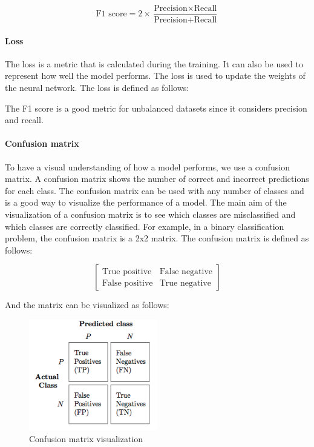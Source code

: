 \begin{equation}
    \text{F1 score} = 2 \times \frac{\text{Precision} \times \text{Recall}}{\text{Precision} + \text{Recall}}
\end{equation}

\paragraph{Loss}

The loss is a metric that is calculated during the training. It can also be used to represent how well the model performs. The loss is used to update the weights of the neural network. The loss is defined as follows:

The F1 score is a good metric for unbalanced datasets since it considers precision and recall. 

\paragraph{Confusion matrix}

To have a visual understanding of how a model performs, we use a confusion matrix. A confusion matrix shows the number of correct and incorrect predictions for each class. The confusion matrix can be used with any number of classes and is a good way to visualize the performance of a model. The main aim of the visualization of a confusion matrix is to see which classes are misclassified and which classes are correctly classified. For example, in a binary classification problem, the confusion matrix is a 2x2 matrix. The confusion matrix is defined as follows:

\begin{equation}
    \begin{bmatrix}
        \text{True positive} & \text{False negative} \\
        \text{False positive} & \text{True negative}
    \end{bmatrix}
\end{equation}

And the matrix can be visualized as follows:

\begin{figure}[H]
    \centering
    \includegraphics[width=0.5\textwidth]{images/confusion_matrix_example.png}
    \caption{Confusion matrix visualization}
    \label{fig:confusion_matrix}
\end{figure}

